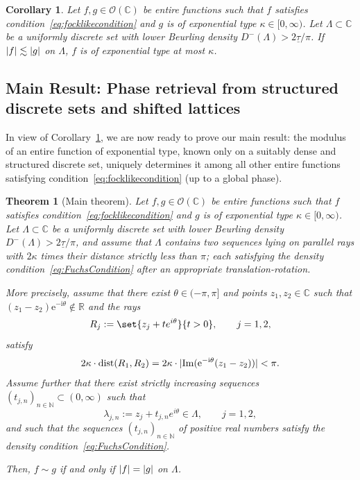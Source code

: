 \documentclass{article}
\newcommand{\bbC}{\mathbb{C}}
\newcommand{\calO}{\mathcal{O}}
\DeclarePairedDelimiter{\abs}{\lvert}{\rvert}
\renewcommand{\Im}{\operatorname{Im}}
\newtheorem{theorem}{Theorem}
\newtheorem{corollary}{Corollary}
\theoremstyle{remark}
\begin{document}
    \begin{corollary}\label{cor:EarlExponentialType}
        Let $f, g \in \calO(\bbC)$ be entire functions such that $f$ satisfies condition~\eqref{eq:focklikecondition} and $g$ is of exponential type $\kappa \in [0, \infty)$. Let $\Lambda \subset \bbC$ be a uniformly discrete set with lower Beurling density $D^{-}(\Lambda) > 2 \underline \tau / \pi$. If $\abs{f} \lesssim \abs{g}$ on $\Lambda$, $f$ is of exponential type at most $\kappa$.
    \end{corollary}

    \subsection{Main Result: Phase retrieval from structured discrete sets and shifted lattices}

    In view of Corollary~\ref{cor:EarlExponentialType}, we are now ready to prove our main result: the modulus of an entire function of exponential type, known only on a suitably dense and structured discrete set, uniquely determines it among all other entire functions satisfying condition~\ref{eq:focklikecondition} (up to a global phase).

    \begin{theorem}[Main theorem]\label{thm:MainTheorem}
        Let $f, g \in \calO(\bbC)$ be entire functions such that $f$ satisfies condition~\eqref{eq:focklikecondition} and $g$ is of exponential type $\kappa \in [0, \infty)$. Let $\Lambda \subset \bbC$ be a uniformly discrete set with lower Beurling density $D^{-}(\Lambda) > 2 \underline \tau / \pi$, and assume that $\Lambda$ contains two sequences lying on parallel rays with $2 \kappa$ times their distance strictly less than $\pi$; each satisfying the density condition~\eqref{eq:FuchsCondition} after an appropriate translation-rotation.

        More precisely, assume that there exist $\theta \in (-\pi,\pi]$ and points $z_1,z_2 \in \mathbb C$ such that $(z_1-z_2) \mathrm e^{- \mathrm i \theta} \not\in \mathbb R$ and the rays
        \[
            R_j := \set{ z_j + t e^{i\theta} }{ t > 0 }, \qquad j=1,2,
        \]
        satisfy
        \[
            2 \kappa \cdot \mathrm{dist}(R_1,R_2) = 2 \kappa \cdot \abs{\Im (\mathrm{e}^{-\mathrm{i}\theta}(z_1 - z_2))} < \pi.
        \]
        Assume further that there exist strictly increasing sequences $(t_{j,n})_{n \in\mathbb N} \subset (0,\infty)$ such that
        \[
            \lambda_{j,n} := z_j + t_{j,n} e^{i\theta} \in \Lambda, \qquad j=1,2,
        \]
        and such that the sequences $(t_{j,n})_{n\in\mathbb N}$ of positive real numbers satisfy the density condition~\eqref{eq:FuchsCondition}.
        
        Then, $f \sim g$ if and only if $\abs{f} = \abs{g}$ on $\Lambda$.
    \end{theorem}
\end{document}
